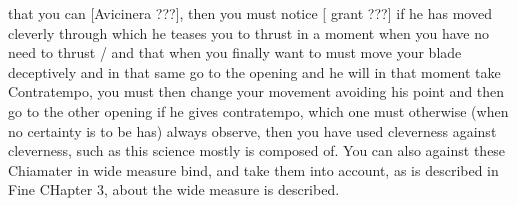 \newpage


\newpage


that you can [Avicinera ???], then you must notice [ grant ???] if he
has moved cleverly through which he teases you to thrust in a moment
when you have no need to thrust / and that when you finally want to
must move your blade deceptively and in that same go to the opening
and he will in that moment take Contratempo, you must then change your
movement avoiding his point and then go to the other opening if he
gives contratempo, which one must otherwise (when no certainty is to be
has) always observe, then you have used cleverness against cleverness,
such as this science mostly is composed of. You can also against these
Chiamater in wide measure bind, and take them into account, as is
described in Fine CHapter 3, about the wide measure is described.


